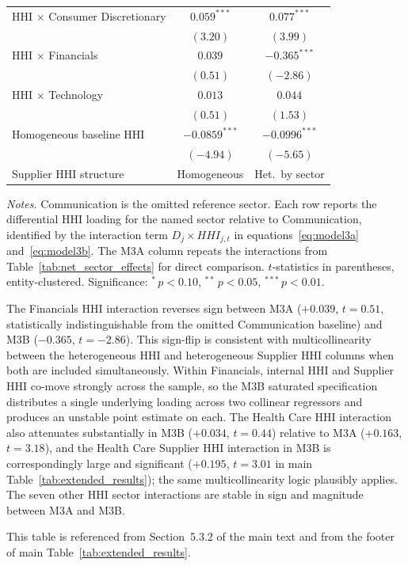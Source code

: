 \begin{table}[!htbp]
\begin{threeparttable}
\begin{tabular}{l c c}
HHI $\times$ Consumer Discretionary & $0.059^{***}$   & $0.077^{***}$   \\
                                    & $(3.20)$        & $(3.99)$        \\
HHI $\times$ Financials             & $0.039$         & $-0.365^{***}$  \\
                                    & $(0.51)$        & $(-2.86)$       \\
HHI $\times$ Technology             & $0.013$         & $0.044$         \\
                                    & $(0.51)$        & $(1.53)$        \\
\midrule
Homogeneous baseline HHI            & $-0.0859^{***}$ & $-0.0996^{***}$ \\
                                    & $(-4.94)$       & $(-5.65)$       \\
Supplier HHI structure              & Homogeneous     & Het.\ by sector \\
\bottomrule
\end{tabular}

\begin{tablenotes}[flushleft]
\footnotesize
\item \textit{Notes.} Communication is the omitted reference sector. Each row
reports the differential HHI loading for the named sector relative to
Communication, identified by the interaction term $D_j \times HHI_{j,t}$ in
equations~\eqref{eq:model3a} and~\eqref{eq:model3b}. The M3A column repeats
the interactions from Table~\ref{tab:net_sector_effects} for direct comparison.
$t$-statistics in parentheses, entity-clustered. Significance: $^{*}\,p<0.10$,
$^{**}\,p<0.05$, $^{***}\,p<0.01$.
\item The Financials HHI interaction reverses sign between M3A ($+0.039$,
$t=0.51$, statistically indistinguishable from the omitted Communication
baseline) and M3B ($-0.365$, $t=-2.86$). This sign-flip is consistent with
multicollinearity between the heterogeneous HHI and heterogeneous Supplier HHI
columns when both are included simultaneously. Within Financials, internal
HHI and Supplier HHI co-move strongly across the sample, so the M3B saturated
specification distributes a single underlying loading across two collinear
regressors and produces an unstable point estimate on each. The Health Care
HHI interaction also attenuates substantially in M3B ($+0.034$, $t=0.44$)
relative to M3A ($+0.163$, $t=3.18$), and the Health Care Supplier HHI
interaction in M3B is correspondingly large and significant
($+0.195$, $t=3.01$ in main Table~\ref{tab:extended_results}); the same
multicollinearity logic plausibly applies. The seven other HHI sector
interactions are stable in sign and magnitude between M3A and M3B.
\item This table is referenced from Section~5.3.2 of the main text and from
the footer of main Table~\ref{tab:extended_results}.
\end{tablenotes}
\end{threeparttable}

\end{table}
